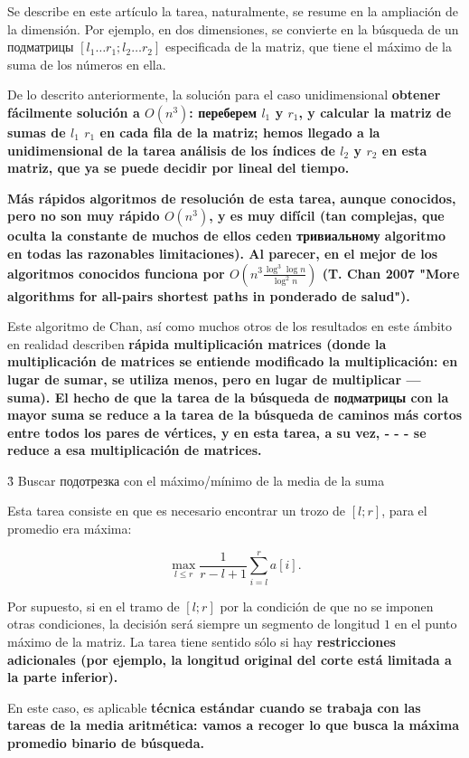 Se describe en este artículo la tarea, naturalmente, se resume en la ampliación de la dimensión. Por ejemplo, en dos dimensiones, se convierte en la búsqueda de un подматрицы $[l_1 \ldots r_1; l_2 \ldots r_2]$ especificada de la matriz, que tiene el máximo de la suma de los números en ella.

De lo descrito anteriormente, la solución para el caso unidimensional \bf{obtener fácilmente} solución a $O(n^3)$: переберем $l_1$ y $r_1$, y calcular la matriz de sumas de $l_1$ $r_1$ en cada fila de la matriz; hemos llegado a la unidimensional de la tarea análisis de los índices de $l_2$ y $r_2$ en esta matriz, que ya se puede decidir por lineal del tiempo.

\bf{Más rápidos} algoritmos de resolución de esta tarea, aunque conocidos, pero no son muy rápido $O(n^3)$, y es muy difícil (tan complejas, que oculta la constante de muchos de ellos ceden тривиальному algoritmo en todas las razonables limitaciones). Al parecer, en el mejor de los algoritmos conocidos funciona por $O \left( n^3 \frac{ \log^3 \log n }{ \log^2 n} \right)$ (T. Chan 2007 "More algorithms for all-pairs shortest paths in ponderado de salud").

Este algoritmo de Chan, así como muchos otros de los resultados en este ámbito en realidad describen \bf{rápida multiplicación} matrices (donde la multiplicación de matrices se entiende modificado la multiplicación: en lugar de sumar, se utiliza menos, pero en lugar de multiplicar --- suma). El hecho de que la tarea de la búsqueda de подматрицы con la mayor suma se reduce a la tarea de la búsqueda de caminos más cortos entre todos los pares de vértices, y en esta tarea, a su vez, - - - se reduce a esa multiplicación de matrices.

\h3{ Buscar подотрезка con el máximo/mínimo de la media de la suma }

Esta tarea consiste en que es necesario encontrar un trozo de $[l;r]$, para el promedio era máxima:

$$ \max_{l \le r} \frac{ 1 }{ r-l+1 } \sum_{i=l}^{r} a[i]. $$

Por supuesto, si en el tramo de $[l;r]$ por la condición de que no se imponen otras condiciones, la decisión será siempre un segmento de longitud $1$ en el punto máximo de la matriz. La tarea tiene sentido sólo si hay \bf{restricciones adicionales} (por ejemplo, la longitud original del corte está limitada a la parte inferior).

En este caso, es aplicable \bf{técnica estándar} cuando se trabaja con las tareas de la media aritmética: vamos a recoger lo que busca la máxima promedio \bf{binario de búsqueda}.

